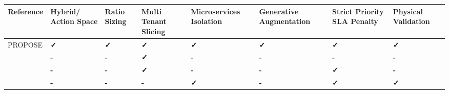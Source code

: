 {\def\LTcaptype{none} %
\begin{longtable}[]{@{}
  >{\centering\arraybackslash}p{}
  >{\raggedright\arraybackslash}p{}
  >{\raggedright\arraybackslash}p{}
  >{\raggedright\arraybackslash}p{}
  >{\raggedright\arraybackslash}p{}
  >{\raggedright\arraybackslash}p{}
  >{\raggedright\arraybackslash}p{}
  >{\raggedright\arraybackslash}p{}@{}}
\toprule\noalign{}
\begin{minipage}[b]{\linewidth}\centering
Reference
\end{minipage} & \begin{minipage}[b]{\linewidth}\centering
Hybrid/ Action Space
\end{minipage} & \begin{minipage}[b]{\linewidth}\centering
Ratio Sizing
\end{minipage} & \begin{minipage}[b]{\linewidth}\centering
Multi Tenant Slicing
\end{minipage} & \begin{minipage}[b]{\linewidth}\centering
Microservices Isolation
\end{minipage} & \begin{minipage}[b]{\linewidth}\centering
Generative Augmentation
\end{minipage} & \begin{minipage}[b]{\linewidth}\centering
Strict Priority SLA Penalty
\end{minipage} & \begin{minipage}[b]{\linewidth}\centering
Physical Validation
\end{minipage} \\
\midrule\noalign{}
\endhead
\bottomrule\noalign{}
\endlastfoot
PROPOSE & \textbf{✓} & \textbf{✓} & \textbf{✓} & \textbf{✓} & \textbf{✓} & \textbf{✓} & \textbf{✓} \\
\cite{b22} & \textbf{-} & \textbf{-} & \textbf{✓} & \textbf{-} & \textbf{-} & \textbf{-} & \textbf{-} \\
\cite{b23} & \textbf{-} & \textbf{-} & \textbf{✓} & \textbf{-} & \textbf{-} & \textbf{✓} & \textbf{-} \\
\cite{b24} & \textbf{-} & \textbf{-} & \textbf{-} & \textbf{✓} & \textbf{-} & \textbf{✓} & \textbf{✓} \\

\end{longtable}}
